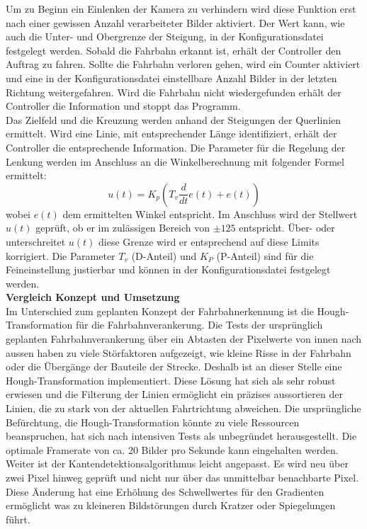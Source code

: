 Um zu Beginn ein Einlenken der Kamera zu verhindern wird diese Funktion erst nach einer gewissen Anzahl verarbeiteter Bilder aktiviert. Der Wert kann, wie auch die Unter- und Obergrenze der Steigung, in der Konfigurationsdatei festgelegt werden. 
Sobald die Fahrbahn erkannt ist, erhält der Controller den Auftrag zu fahren. Sollte die Fahrbahn verloren gehen, wird ein Counter aktiviert und eine in der Konfigurationsdatei einstellbare Anzahl Bilder in der letzten Richtung weitergefahren. Wird die Fahrbahn nicht wiedergefunden erhält der Controller die Information und stoppt das Programm.\\
Das Zielfeld und die Kreuzung werden anhand der Steigungen der Querlinien ermittelt. Wird eine Linie, mit entsprechender Länge identifiziert, erhält der Controller die entsprechende Information.
Die Parameter für die Regelung der Lenkung werden im Anschluss an die Winkelberechnung mit folgender Formel ermittelt:
\[
u(t) = K_p\left(T_v\frac{d}{dt}e(t) + e(t)\right)
\]
wobei $e(t)$ dem ermittelten Winkel entspricht. Im Anschluss wird der Stellwert $u(t)$ geprüft, ob er im zulässigen Bereich von $\pm 125$ entspricht. Über- oder unterschreitet $u(t)$ diese Grenze wird er entsprechend auf diese Limits korrigiert. Die Parameter $T_v$ (D-Anteil) und $K_{P}$ (P-Anteil) sind für die Feineinstellung justierbar und können in der Konfigurationsdatei festgelegt werden.\\[0.2cm]
\textbf{Vergleich Konzept und Umsetzung}\\[0.2cm]
Im Unterschied zum geplanten Konzept der Fahrbahnerkennung ist die Hough-Transformation für die Fahrbahnverankerung. Die Tests der ursprünglich geplanten Fahrbahnverankerung über ein Abtasten der Pixelwerte von innen nach aussen haben zu viele Störfaktoren aufgezeigt, wie kleine Risse in der Fahrbahn oder die Übergänge der Bauteile der Strecke. Deshalb ist an dieser Stelle eine Hough-Transformation implementiert. Diese Lösung hat sich als sehr robust erwiesen und die Filterung der Linien ermöglicht ein präzises aussortieren der Linien, die zu stark von der aktuellen Fahrtrichtung abweichen. Die ursprüngliche Befürchtung, die Hough-Transformation könnte zu viele Ressourcen beanspruchen, hat sich nach intensiven Tests als unbegründet herausgestellt. Die optimale Framerate von ca. 20 Bilder pro Sekunde kann eingehalten werden.\\
Weiter ist der Kantendetektionsalgorithmus leicht angepasst. Es wird neu über zwei Pixel hinweg geprüft und nicht nur über das unmittelbar benachbarte Pixel. Diese Änderung hat eine Erhöhung des Schwellwertes für den Gradienten ermöglicht was zu kleineren Bildstörungen durch Kratzer oder Spiegelungen führt.\\
